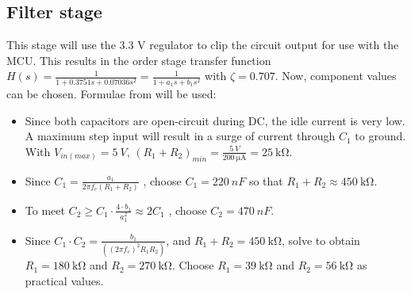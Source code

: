 \subsection{Filter stage}{\label{rangeSensor_filterDesign}}

This stage will use the 3.3 V regulator to clip the circuit output for use with the MCU.
This results in the  order stage transfer function $H(s) = \frac{1}{1 + 0.3751 s + 0.07036 s^2} = \frac{1}{1 + a_1 s + b_1 s^2}$ with $\zeta = 0.707$. Now, component values can be chosen.
Formulae from \cite{filterDesign} will be used:

\begin{itemize}
  \item Since both capacitors are open-circuit during DC, the idle current is very low. A maximum step input will result in a surge of current through $C_1$ to ground.
        With $V_{in(max)} = \SI{5}{V}$, $(R_1 + R_2)_{min} = \frac{\SI{5}{V}}{\SI{200}{\micro\ampere}} = \SI{25}{\kilo\ohm}$.
  \item Since $C_1 = \frac{a_1}{2 \pi f_c (R_1 + R_2)}$ \cite{filterDesign}, choose $C_1 = \SI{220}{nF}$ so that $R_1 + R_2 \approx \SI{450}{\kilo\ohm}$.
  \item To meet $C_2 \geq C_1 \cdot \frac{4 \cdot b_1}{a_1 ^2} \approx 2 C_1 $ \cite{filterDesign}, choose $C_2 = \SI{470}{nF}$.
  \item Since $C_1 \cdot C_2 = \frac{b_1}{((2 \pi f_c)^2 R_1 R_2)}$, and $R_1 + R_2 = \SI{450}{\kilo\ohm}$, solve to obtain $R_1 = \SI{180}{\kilo\ohm}$ and $R_2 = \SI{270}{\kilo\ohm}$.
        Choose $R_1 = \SI{39}{\kilo\ohm}$ and $R_2 = \SI{56}{\kilo\ohm}$ as practical values.
\end{itemize}